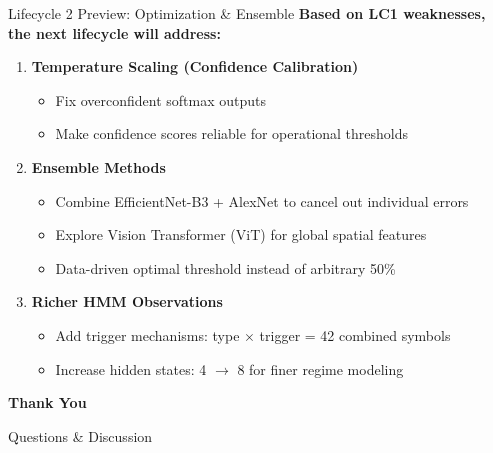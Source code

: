 \documentclass[aspectratio=169]{beamer}
\begin{document}
\begin{frame}{Lifecycle 2 Preview: Optimization \& Ensemble}
    \textbf{Based on LC1 weaknesses, the next lifecycle will address:}

    \vspace{0.3cm}
    \begin{enumerate}
        \item \textbf{Temperature Scaling (Confidence Calibration)}
            \begin{itemize}
                \item Fix overconfident softmax outputs
                \item Make confidence scores reliable for operational thresholds
            \end{itemize}

        \item \textbf{Ensemble Methods}
            \begin{itemize}
                \item Combine EfficientNet-B3 + AlexNet to cancel out individual errors
                \item Explore Vision Transformer (ViT) for global spatial features
                \item Data-driven optimal threshold instead of arbitrary 50\%
            \end{itemize}

        \item \textbf{Richer HMM Observations}
            \begin{itemize}
                \item Add trigger mechanisms: type $\times$ trigger = 42 combined symbols
                \item Increase hidden states: 4 $\to$ 8 for finer regime modeling
            \end{itemize}
    \end{enumerate}
\end{frame}

\begin{frame}{}
    \centering
    \vspace{2cm}
    {\Large \textbf{Thank You}}

    \vspace{1cm}
    Questions \& Discussion
\end{frame}
\end{document}
